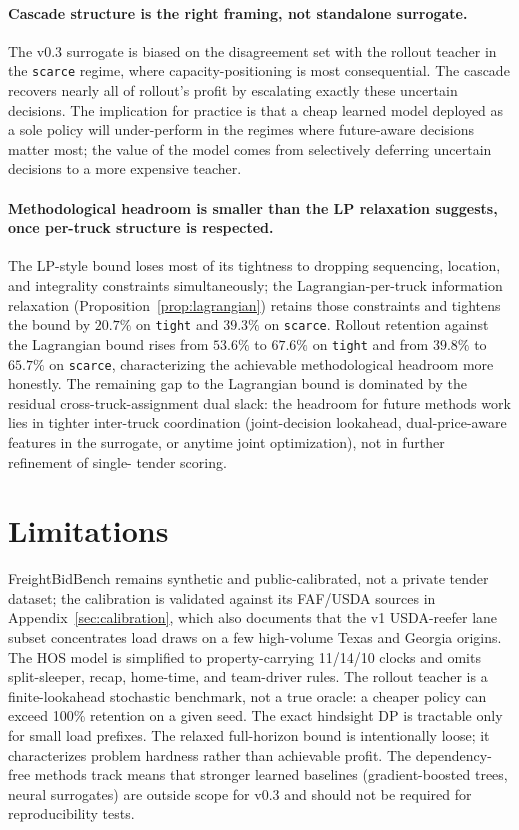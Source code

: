 \documentclass[11pt]{article}
\begin{document}
\paragraph{Cascade structure is the right framing, not standalone
surrogate.} The v0.3 surrogate is biased on the disagreement set with the
rollout teacher in the \texttt{scarce} regime, where capacity-positioning
is most consequential. The cascade recovers nearly all of rollout's
profit by escalating exactly these uncertain decisions. The implication
for practice is that a cheap learned model deployed as a sole policy
will under-perform in the regimes where future-aware decisions matter
most; the value of the model comes from selectively deferring uncertain
decisions to a more expensive teacher.

\paragraph{Methodological headroom is smaller than the LP relaxation
suggests, once per-truck structure is respected.} The LP-style bound
loses most of its tightness to dropping sequencing, location, and
integrality constraints simultaneously; the Lagrangian-per-truck
information relaxation (Proposition~\ref{prop:lagrangian}) retains those
constraints and tightens the bound by $20.7\%$ on \texttt{tight} and
$39.3\%$ on \texttt{scarce}. Rollout retention against the Lagrangian
bound rises from $53.6\%$ to $67.6\%$ on \texttt{tight} and from $39.8\%$
to $65.7\%$ on \texttt{scarce}, characterizing the achievable
methodological headroom more honestly. The remaining gap to the
Lagrangian bound is dominated by
the residual cross-truck-assignment dual slack: the headroom for
future methods work lies in tighter inter-truck coordination
(joint-decision lookahead, dual-price-aware features in the surrogate,
or anytime joint optimization), not in further refinement of single-
tender scoring.

\section{Limitations}

FreightBidBench remains synthetic and public-calibrated, not a private
tender dataset; the calibration is validated against its FAF/USDA sources
in Appendix~\ref{sec:calibration}, which also documents that the v1
USDA-reefer lane subset concentrates load draws on a few high-volume Texas
and Georgia origins. The HOS model is simplified to property-carrying
11/14/10 clocks and omits split-sleeper, recap, home-time, and team-driver
rules.
The rollout teacher is a finite-lookahead stochastic benchmark, not a
true oracle: a cheaper policy can exceed 100\% retention on a given seed.
The exact hindsight DP is tractable only for small load prefixes. The
relaxed full-horizon bound is intentionally loose; it characterizes
problem hardness rather than achievable profit. The dependency-free
methods track means that stronger learned baselines (gradient-boosted
trees, neural surrogates) are outside scope for v0.3 and should not be
required for reproducibility tests.
\end{document}
